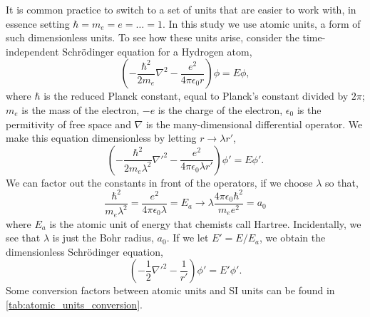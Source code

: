         It is common practice to switch to a set of units that are easier to work with,
        in essence setting $\hbar = m_e = e = \dots = 1$. In this study we use atomic units, a
        form of such dimensionless units. To see how these units arise, consider
        the time-independent Schrödinger equation for a Hydrogen atom,
        \begin{equation}
            \left(-\frac{\hbar^2}{2m_e}\nabla^2 - \frac{e^2}{4\pi\epsilon_0 r} \right)
            \phi = E\phi,
        \end{equation}
        where $\hbar$ is the reduced Planck constant, equal to Planck's constant divided by 
        $2\pi$; $m_e$ is the mass of the electron, $-e$ is the charge of the electron, 
        $\epsilon_0$ is the permitivity of free space and $\nabla$ is the many-dimensional 
        differential operator. 
        We make this equation dimensionless by 
        letting $r \to \lambda r'$,
        \begin{equation}
            \left(-\frac{\hbar^2}{2m_e\lambda^2}\nabla'^2 - \frac{e^2}{4\pi\epsilon_0\lambda r'} \right)
            \phi' = E\phi'.
        \end{equation}
        We can factor out the constants in front of the operators, if we choose $\lambda$ so that,
        \begin{equation}
            \frac{\hbar^2}{m_e\lambda^2} = \frac{e^2}{4\pi \epsilon_0 \lambda} = E_a
            \to \lambda \frac{4\pi\epsilon_0\hbar^2}{m_e e^2} = a_0
        \end{equation}
        where $E_a$ is the atomic unit of energy that chemists call Hartree. Incidentally,
        we see that $\lambda$ is just the Bohr radius, $a_0$. If we let $E' = E/E_a$, we 
        obtain the dimensionless Schrödinger equation,
        \begin{equation}
            \left(-\frac{1}{2}\nabla'^2 - \frac{1}{r'} \right) \phi' = E'\phi'.
        \end{equation}
        Some conversion factors between atomic units and SI units can be found in
        \autoref{tab:atomic_units_conversion}.

